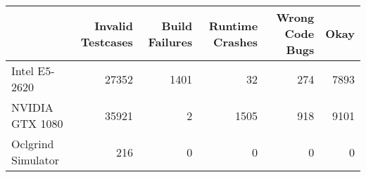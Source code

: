 \begin{tabular}{lrrrrr}
\toprule
{} &  Invalid Testcases &  Build Failures &  Runtime Crashes &  Wrong Code Bugs &  Okay \\
\midrule
Intel E5-2620      &              27352 &            1401 &               32 &              274 &  7893 \\
NVIDIA GTX 1080    &              35921 &               2 &             1505 &              918 &  9101 \\
Oclgrind Simulator &                216 &               0 &                0 &                0 &     0 \\
\bottomrule
\end{tabular}

